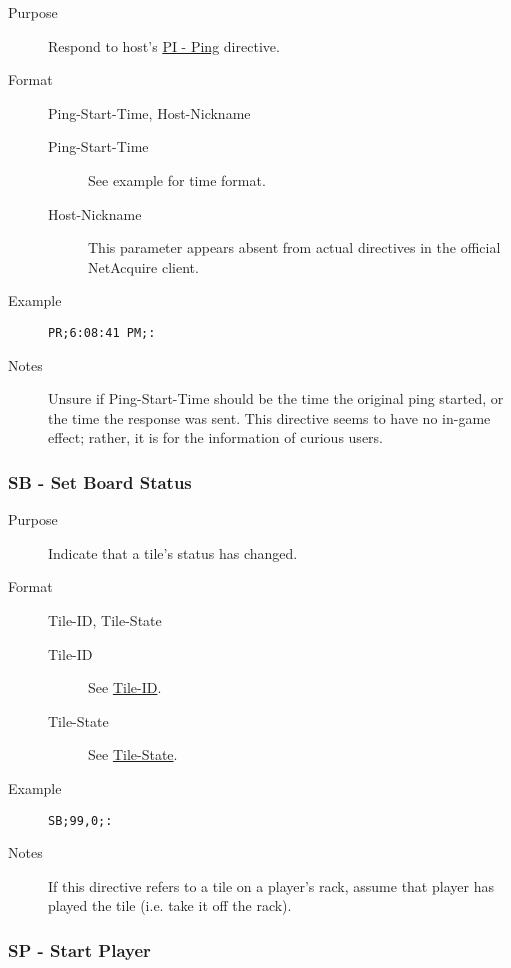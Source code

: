 \documentclass{article}
\providecommand{\wiredata}[1]{\texttt{{#1}}}
\begin{document}
\begin{description}
  \item[Purpose] Respond to host's \hyperref[ssub:pi_ping_host_]{PI - Ping} directive.
  \item[Format] Ping-Start-Time, Host-Nickname
  \begin{description}
    \item[Ping-Start-Time] See example for time format.
    \item[Host-Nickname] This parameter appears absent from actual directives in the official NetAcquire client.
  \end{description}
  \item[Example] \wiredata{PR;6:08:41 PM;:}
  \item[Notes] Unsure if Ping-Start-Time should be the time the original ping started, or the time the response was sent. This directive seems to have no in-game effect; rather, it is for the information of curious users.
\end{description}


\subsubsection{SB - Set Board Status} %
\label{ssub:sb_set_board_status}

\begin{description}
  \item[Purpose] Indicate that a tile's status has changed.
  \item[Format] Tile-ID, Tile-State
  \begin{description}
    \item[Tile-ID] See \hyperref[ssub:tile_id]{Tile-ID}.
    \item[Tile-State] See \hyperref[ssub:tile_state]{Tile-State}.
  \end{description}
  \item[Example] \wiredata{SB;99,0;:}
  \item[Notes] If this directive refers to a tile on a player's rack, assume that player has played the tile (i.e. take it off the rack).
\end{description}


\subsubsection{SP - Start Player} %
\label{ssub:sp_start_player}
\end{document}
